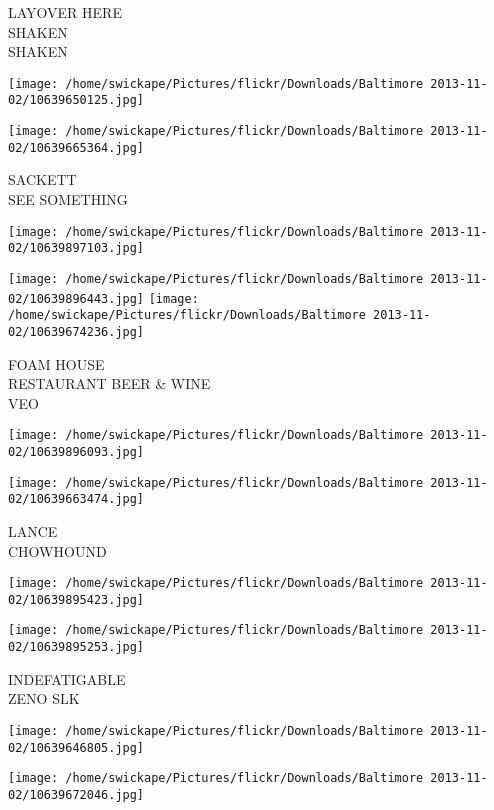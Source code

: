 \documentclass[10pt,letterpaper]{article}
\begin{document}
LAYOVER HERE\\
SHAKEN\\
SHAKEN
\pagebreak

\texttt{[image: /home/swickape/Pictures/flickr/Downloads/Baltimore 2013-11-02/10639650125.jpg]}

\vspace{0.25in}
\texttt{[image: /home/swickape/Pictures/flickr/Downloads/Baltimore 2013-11-02/10639665364.jpg]}

SACKETT\\
SEE SOMETHING
\pagebreak

\texttt{[image: /home/swickape/Pictures/flickr/Downloads/Baltimore 2013-11-02/10639897103.jpg]}

\vspace{0.25in}
\texttt{[image: /home/swickape/Pictures/flickr/Downloads/Baltimore 2013-11-02/10639896443.jpg]}
\texttt{[image: /home/swickape/Pictures/flickr/Downloads/Baltimore 2013-11-02/10639674236.jpg]}

FOAM HOUSE\\
RESTAURANT BEER \& WINE\\
VEO
\pagebreak

\texttt{[image: /home/swickape/Pictures/flickr/Downloads/Baltimore 2013-11-02/10639896093.jpg]}

\vspace{0.25in}
\texttt{[image: /home/swickape/Pictures/flickr/Downloads/Baltimore 2013-11-02/10639663474.jpg]}

LANCE\\
CHOWHOUND
\pagebreak

\texttt{[image: /home/swickape/Pictures/flickr/Downloads/Baltimore 2013-11-02/10639895423.jpg]}

\vspace{0.25in}
\texttt{[image: /home/swickape/Pictures/flickr/Downloads/Baltimore 2013-11-02/10639895253.jpg]}

INDEFATIGABLE\\
ZENO SLK
\pagebreak

\texttt{[image: /home/swickape/Pictures/flickr/Downloads/Baltimore 2013-11-02/10639646805.jpg]}

\vspace{0.25in}
\texttt{[image: /home/swickape/Pictures/flickr/Downloads/Baltimore 2013-11-02/10639672046.jpg]}
\end{document}
